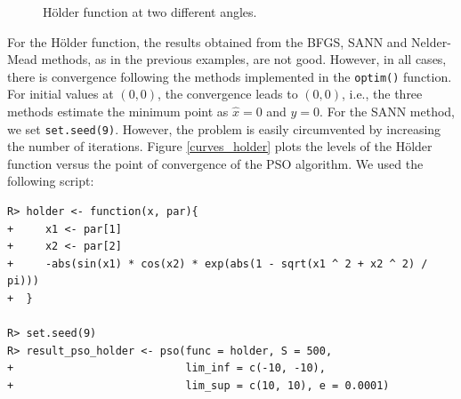 \documentclass[10pt,letterpaper]{article}
\begin{document}
\begin{figure}[H]
	\centering
	\caption{H\"{o}lder function at two different angles.}
	\label{fig:holder}
\end{figure}

For the H\"{o}lder function, the results obtained from the BFGS, SANN and Nelder-Mead methods, as in the previous examples, are not good.
However, in all cases, there is convergence following the methods implemented in the \texttt{optim()} function.
For initial values at $(0, 0)$, the convergence leads to $(0, 0)$, i.e., the three methods estimate the minimum point as $\widehat{x} = 0$ and $\widehat{y} = 0$.
For the SANN method, we set \texttt{set.seed(9)}.
However, the problem is easily circumvented by increasing the number of iterations.
Figure \ref{curves_holder}  plots the levels of the H\"{o}lder function versus the point of convergence of the PSO algorithm.
We used the following script:
\begin{verbatim}
R> holder <- function(x, par){
+     x1 <- par[1]
+     x2 <- par[2]
+     -abs(sin(x1) * cos(x2) * exp(abs(1 - sqrt(x1 ^ 2 + x2 ^ 2) / pi)))
+  }

R> set.seed(9)
R> result_pso_holder <- pso(func = holder, S = 500,
+                           lim_inf = c(-10, -10),
+                           lim_sup = c(10, 10), e = 0.0001)
\end{verbatim}
\end{document}
